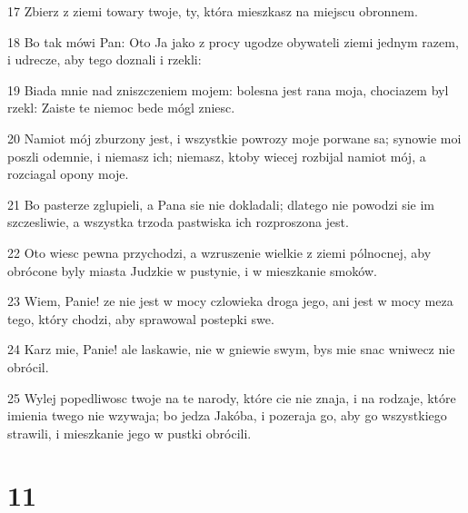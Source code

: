 \par 17 Zbierz z ziemi towary twoje, ty, która mieszkasz na miejscu obronnem.
\par 18 Bo tak mówi Pan: Oto Ja jako z procy ugodze obywateli ziemi jednym razem, i udrecze, aby tego doznali i rzekli:
\par 19 Biada mnie nad zniszczeniem mojem: bolesna jest rana moja, chociazem byl rzekl: Zaiste te niemoc bede mógl zniesc.
\par 20 Namiot mój zburzony jest, i wszystkie powrozy moje porwane sa; synowie moi poszli odemnie, i niemasz ich; niemasz, ktoby wiecej rozbijal namiot mój, a rozciagal opony moje.
\par 21 Bo pasterze zglupieli, a Pana sie nie dokladali; dlatego nie powodzi sie im szczesliwie, a wszystka trzoda pastwiska ich rozproszona jest.
\par 22 Oto wiesc pewna przychodzi, a wzruszenie wielkie z ziemi pólnocnej, aby obrócone byly miasta Judzkie w pustynie, i w mieszkanie smoków.
\par 23 Wiem, Panie! ze nie jest w mocy czlowieka droga jego, ani jest w mocy meza tego, który chodzi, aby sprawowal postepki swe.
\par 24 Karz mie, Panie! ale laskawie, nie w gniewie swym, bys mie snac wniwecz nie obrócil.
\par 25 Wylej popedliwosc twoje na te narody, które cie nie znaja, i na rodzaje, które imienia twego nie wzywaja; bo jedza Jakóba, i pozeraja go, aby go wszystkiego strawili, i mieszkanie jego w pustki obrócili.

\chapter{11}

